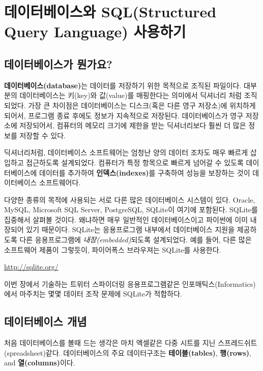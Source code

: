 
\chapter{데이터베이스와 SQL(Structured Query Language) 사용하기}

\section{데이터베이스가 뭔가요?}

{\bf 데이터베이스(database)}는 데이터를 저장하기 위한 목적으로 조직된 파일이다. 
대부분의 데이터베이스는 키(key)와 값(value)를 매핑한다는 의미에서 딕셔너리 처럼 조직되었다.
가장 큰 차이점은 데이터베이스는 디스크(혹은 다른 영구 저장소)에 위치하게 되어서, 프로그램 종료 후에도 정보가 지속적으로 저장된다.
데이터베이스가 영구 저장소에 저장되어서, 컴퓨터의 메모리 크기에 제한을 받는 딕셔너리보다 훨씬 더 많은 정보를 저장할 수 있다.


딕셔너리처럼, 데이터베이스 소프트웨어는 엄청난 양의 데이터 조차도 매우 빠르게 삽입하고 접근하도록 설계되었다.
컴퓨터가 특정 항목으로 빠르게 넘어갈 수 있도록 데이터베이스에 데이터를 추가하여 {\bf 인덱스(indexes)}를 구축하여 성능을 보장하는 것이 데이터베이스 소프트웨어다.

다양한 종류의 목적에 사용되는 서로 다른 많은 데이터베이스 시스템이 있다. Oracle, MySQL, Microsoft SQL Server, 
PostgreSQL, SQLite이 여기에 포함된다. SQLite를 집중해서 살펴볼 것이다. 왜냐하면 매우 일반적인 데이터베이스이고 파이썬에 이미 내장되어 있기 때문이다.
SQLite는 응용프로그램 내부에서 데이터베이스 지원을 제공하도록 다른 응용프로그램에 \emph{내장(embedded)}되도록 설계되었다.
예를 들어, 다른 많은 소프트웨어 제품이 그렇듯이, 파이어폭스 브라우져는 SQLite를 사용한다.

\url{http://sqlite.org/}

이번 장에서 기술하는 트위터 스파이더링 응용프로그램같은 인포매틱스(Informatics)에서 마주치는 몇몇 데이터 조작 문제에 SQLite가 적합하다.


\section{데이터베이스 개념}
처음 데이터베이스를 볼때 드는 생각은 마치 엑셀같은 다중 시트를 지닌 스프레드쉬트(spreadsheet)같다.
데이터베이스의 주요 데이터구조는 {\bf 테이블(tables)}, {\bf 행(rows)}, and {\bf 열(columns)}이다.  


